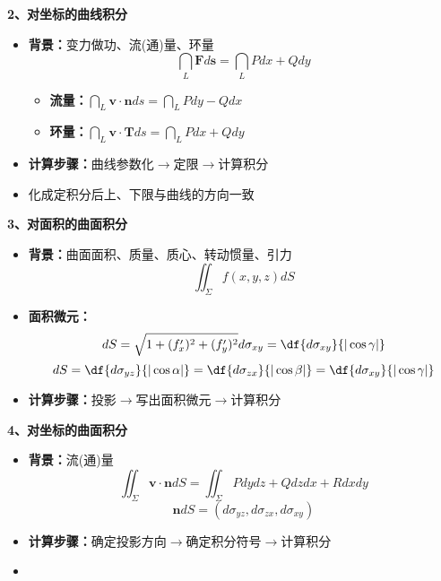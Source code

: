 \begin{frame}
	\linespread{1.2}
	{\bf 2、对坐标的曲线积分}\pause 
	\begin{itemize}
	  \item {\bf 背景：}变力做功、流(通)量、环量\pause 
	  	$$\dint_L\bm{F}d\bm{s}=\dint_L Pdx+Qdy$$\pause 
	  \begin{itemize}
	    \item {\bf 流量：}$\dint_L\bm{v}\cdot\bm{n}ds=\dint_LPdy-Qdx$\pause 
	    \item {\bf 环量：}$\dint_L\bm{v}\cdot\bm{T}ds=\dint_LPdx+Qdy$\pause 
	  \end{itemize}
	  \item {\bf 计算步骤：}曲线参数化$\to$定限$\to$计算积分\pause 
	  \item {}\alert{化成定积分后上、下限与曲线的方向一致}
	\end{itemize}
\end{frame}

\begin{frame}
	\linespread{1.2}
	{\bf 3、对面积的曲面积分}\pause 
	\begin{itemize}
	  \item {\bf 背景：}曲面面积、质量、质心、转动惯量、引力\pause 
	 	$$\iint_{\Sigma}f(x,y,z)dS$$\pause 
	  \vspace{-1em}
	  \item {\bf 面积微元：}
		$$dS=\sqrt{1+(f'_x)^2+(f'_y)^2}d\sigma_{xy}=\df{d\sigma_{xy}}{|\cos\gamma|}$$\pause
		$$dS=\df{d\sigma_{yz}}{|\cos\alpha|}=
		\df{d\sigma_{zx}}{|\cos\beta|}
		=\df{d\sigma_{xy}}{|\cos\gamma|}$$\pause 
	  \item {\bf 计算步骤：}投影$\to$写出面积微元$\to$计算积分
	\end{itemize}
\end{frame}

\begin{frame}
	\linespread{1.2}
	{\bf 4、对坐标的曲面积分}\pause 
	\begin{itemize}
	  \item {\bf 背景：}流(通)量\pause 
	 	$$\iint_{\Sigma}\bm{v}\cdot\bm{n}dS=
	 	\iint_{\Sigma}Pdydz+Qdzdx+Rdxdy$$\pause 
	 	$$\bm{n}dS=(d\sigma_{yz},d\sigma_{zx},d\sigma_{xy})$$\pause 
	  \item {\bf 计算步骤：}确定投影方向$\to$确定积分符号$\to$计算积分\pause 
	  \item {}
	\end{itemize}
\end{frame}


